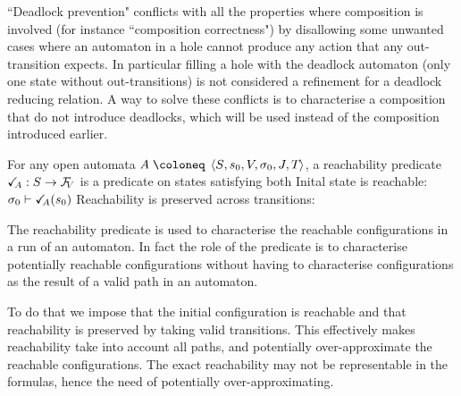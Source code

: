 \documentclass{article}
\begin{document}
``Deadlock prevention" conflicts with all the properties where composition is involved (for instance ``composition correctness") by disallowing some unwanted cases where an automaton in a hole cannot produce any action that any out-transition expects.
In particular filling a hole with the deadlock automaton (only one state without out-transitions) is not considered a refinement for a deadlock reducing relation.
A way to solve these conflicts is to characterise a composition that do not introduce deadlocks, which will be used instead of the composition introduced earlier.
\begin{defi}[Reachability]
For any open automata \(A \defobject \OAg\), a reachability predicate \(\reach{A}: S \to \rformulas[V]\) is a predicate on states satisfying both
 Inital state is reachable: \(\sigma_0 \vdash \reach{A}\mpar{s_0}\)
 Reachability is preserved across transitions: 
\end{defi}
The reachability predicate is used to characterise the reachable configurations in a run of an automaton.
In fact the role of the predicate is to characterise potentially reachable configurations without having to characterise configurations as the result of a valid path in an automaton.

To do that we impose that the initial configuration is reachable and that reachability is preserved by taking valid transitions.
This effectively makes reachability take into account all paths, and potentially over-approximate the reachable configurations.
The exact reachability may not be representable in the formulas, hence the need of potentially over-approximating.
\end{document}
